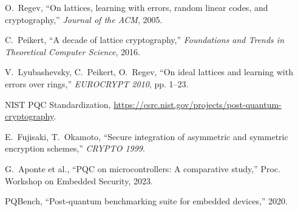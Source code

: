 \documentclass[conference]{IEEEtran}
\begin{document}
\newpage


\begin{thebibliography}{10}

 O.~Regev, ``On lattices, learning with errors, random linear codes, and cryptography,'' \emph{Journal of the ACM}, 2005.

 C.~Peikert, ``A decade of lattice cryptography,'' \emph{Foundations and Trends in Theoretical Computer Science}, 2016.

 V.~Lyubashevsky, C.~Peikert, O.~Regev, ``On ideal lattices and learning with errors over rings,'' \emph{EUROCRYPT 2010}, pp. 1--23.

 NIST PQC Standardization, \url{https://csrc.nist.gov/projects/post-quantum-cryptography}.

 E.~Fujisaki, T.~Okamoto, ``Secure integration of asymmetric and symmetric encryption schemes,'' \emph{CRYPTO 1999}.

 G.~Aponte et al., ``PQC on microcontrollers: A comparative study,'' Proc. Workshop on Embedded Security, 2023.

 PQBench, ``Post-quantum benchmarking suite for embedded devices,'' 2020.

\end{thebibliography}
\end{document}
